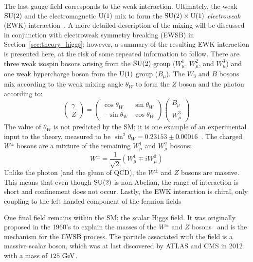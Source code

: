 The last gauge field corresponds to the weak interaction.
Ultimately, the weak $\textrm{SU}(2)$ and the electromagnetic $\textrm{U}(1)$ mix to form the $\textrm{SU}(2)\times\textrm{U}(1)$ \emph{electroweak} (EWK) interaction~\cite{1959.Salam.electroweak, 1959.Glashow.vector-mesons}.
A more detailed description of the mixing will be discussed in conjunction with electroweak symmetry breaking (EWSB) in Section~\ref{sec:theory_higgs}; however, a summary of the resulting EWK interaction is presented here, at the risk of some repeated information to follow.
There are three weak isospin bosons arising from the $\textrm{SU}(2)$ group ($W_{\mu}^1$, $W_{\mu}^2$, and $W_{\mu}^3$) and one weak hypercharge boson from the $\textrm{U}(1)$ group ($B_{\mu}$).
The $W_3$ and $B$ bosons mix according to the weak mixing angle $\theta_W$ to form the $Z$ boson and the photon according to:
\begin{equation}
  \begin{pmatrix}
  \gamma\\
  Z
  \end{pmatrix}
  = 
  \begin{pmatrix}
  \cos{\theta_W} & \sin{\theta_W} \\
  -\sin{\theta_W} & \cos{\theta_W}
  \end{pmatrix}
  \begin{pmatrix}
  B_{\mu} \\
  W_{\mu}^3
  \end{pmatrix}
  \label{eq:weak_mixing}
\end{equation}
The value of $\theta_W$ is not predicted by the SM; it is one example of an experimental input to the theory, measured to be $\sin^2{\theta_W} = 0.23153\pm0.00016$~\cite{2006.weak-mixing}.
The charged $W^{\pm}$ bosons are a mixture of the remaining $W_{\mu}^1$ and $W_{\mu}^2$ bosons:
\begin{equation}
  W^{\pm} = \frac{1}{\sqrt{2}}(W_{\mu}^1 \mp iW_{\mu}^2)
  \label{eq:w_mixing}
\end{equation}
Unlike the photon (and the gluon of QCD), the $W^\pm$ and $Z$ bosons are massive.
This means that even though $\textrm{SU}(2)$ is non-Abelian, the range of interaction is short and confinement does not occur.
Lastly, the EWK interaction is chiral, only coupling to the left-handed component of the fermion fields

One final field remains within the SM: the scalar Higgs field.
It was originally proposed in the 1960's to explain the masses of the $W^{\pm}$ and $Z$ bosons~\cite{1964.Englert.symmetry_breaking, 1964.Higgs.Broken_Symmetries_1, 1964.Higgs.Broken_Symmetries_2} and is the mechanism for the EWSB process.
The particle associated with the field is a massive scalar boson, which was at last discovered by ATLAS and CMS in 2012~\cite{HIGG-2012-27, CMS-HIG-12-028} with a mass of $125\gev$.



